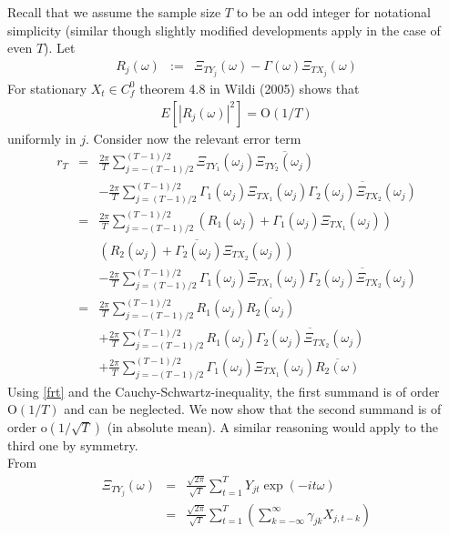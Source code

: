 \documentclass[a4paper]{book}
\begin{document}
\begin{appendix}
Recall that we assume the sample size $T$ to be an odd integer for
notational simplicity (similar though slightly modified developments
apply in the case of even $T$). Let
\begin{eqnarray*}
R_{j}(\omega)&:=&\Xi_{TY_j}(\omega)-\Gamma(\omega)\Xi_{TX_j}(\omega)
\end{eqnarray*}
For stationary $X_t\in C_f^0$   theorem 4.8 in Wildi (2005) 
shows that
\begin{eqnarray}\label{frt}
E[|R_{j}(\omega)|^2]=\textrm{O}(1/{T})
\end{eqnarray}
uniformly in $j$. Consider now the relevant error term
\begin{eqnarray}
r_T&=&\frac{2\pi}{T}\sum_{j=-(T-1)/2}^{(T-1)/2}\Xi_{TY_1}(\omega_j)\overline{\Xi_{TY_2}(\omega_j)}\nonumber\\
&&-\frac{2\pi}{T}\sum_{j=(T-1)/2}^{(T-1)/2}\Gamma_1(\omega_j)\Xi_{TX_1}(\omega_j)
    \overline{\Gamma_2(\omega_j)\Xi_{TX_2}(\omega_j)}\nonumber\\
&=&\frac{2\pi}{T}\sum_{j=-(T-1)/2}^{(T-1)/2}\left(R_1(\omega_j)+\Gamma_1(\omega_j)\Xi_{TX_1}(\omega_j)\right)\nonumber\\
&&\overline{\left(R_2(\omega_j)+\Gamma_2(\omega_j)\Xi_{TX_2}(\omega_j)\right)}\nonumber\\
&&-\frac{2\pi}{T}\sum_{j=(T-1)/2}^{(T-1)/2}\Gamma_1(\omega_j)\Xi_{TX_1}(\omega_j)
    \overline{\Gamma_2(\omega_j)\Xi_{TX_2}(\omega_j)}\nonumber\\
&=&\frac{2\pi}{T}\sum_{j=-(T-1)/2}^{(T-1)/2}R_1(\omega_j)\overline{R_2(\omega_j)}\nonumber\\
&&+\frac{2\pi}{T}\sum_{j=-(T-1)/2}^{(T-1)/2}R_1(\omega_j)
\overline{\Gamma_2(\omega_j)\Xi_{TX_2}(\omega_j)}\label{ssp}\\
&&+\frac{2\pi}{T}\sum_{j=-(T-1)/2}^{(T-1)/2}\Gamma_1(\omega_j)\Xi_{TX_1}(\omega_j)\overline{R_2(\omega)}\nonumber
\end{eqnarray}
Using \ref{frt} and the Cauchy-Schwartz-inequality, the first
summand is of order $\textrm{O}(1/T)$ and can be neglected. We now
show that the second summand is of order $\textrm{o}(1/\sqrt{T})$
(in absolute mean). A similar reasoning would apply to the third one
by symmetry. \\
From
\begin{eqnarray}
\Xi_{TY_j}(\omega)&=&\frac{\sqrt{2\pi}}{\sqrt{T}}\sum_{t=1}^TY_{jt}\exp(-it \omega )\nonumber\\
&=&\frac{\sqrt{2\pi}}{\sqrt{T}}\sum_{t=1}^T
\left(\sum_{k=-\infty}^{\infty}\gamma_{jk} X_{j,t-k} \right)

\end{eqnarray}
\end{appendix}
\end{document}
